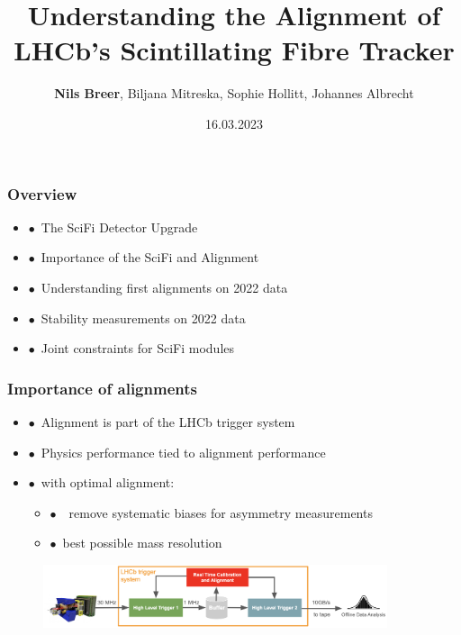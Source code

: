 \documentclass[aspectratio=1610, 12pt, xcolor=dvipsnames]{beamer}
\title{Understanding the Alignment of LHCb's Scintillating Fibre Tracker}
\author[N.Breer]{\textbf{Nils Breer}, Biljana Mitreska, Sophie Hollitt, Johannes Albrecht}
\institute{Maria Laach high energy physics school, Siegen}
\date{16.03.2023}
\begin{document}
\maketitle

\begin{frame}\frametitle{Overview}
  \begin{itemize}
    \item $\bullet$\, The SciFi Detector Upgrade
    \item $\bullet$\, Importance of the SciFi and Alignment
    \item $\bullet$\, Understanding first alignments on 2022 data
    \item $\bullet$\, Stability measurements on 2022 data
    \item $\bullet$\, Joint constraints for SciFi modules
  \end{itemize}
\end{frame}

\begin{frame}\frametitle{Importance of alignments}
  \begin{itemize}
    \item $\bullet$\, Alignment is part of the LHCb trigger system
    \item $\bullet$\, Physics performance tied to alignment performance
    \item $\bullet$\, with optimal alignment:
    \begin{itemize}
      \item $\bullet$\, \to\, remove systematic biases for asymmetry measurements
      \item $\bullet$\, best possible mass resolution
    \end{itemize}
  \end{itemize}
  \begin{figure}
      \includegraphics[width=0.9\textwidth]{logos/dataflow.png}%
  \end{figure}
\end{frame}
\end{document}

